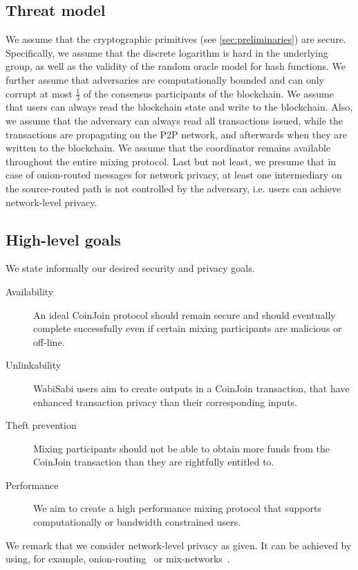 \documentclass[a4paper]{article}
\begin{document}
\subsection{Threat model} \label{sec:threatmodel}

We assume that the cryptographic primitives (see \cref{sec:preliminaries})
are secure. Specifically, we assume that the discrete logarithm is hard in the underlying group, as well as the validity of the random oracle model for hash functions.  We further assume that adversaries are computationally bounded and can only corrupt at most $\frac{1}{3}$ of the consensus participants of the blockchain. We assume that users can always read the blockchain state and write to the blockchain. Also, we assume that the adversary can always read all transactions issued, while the transactions are propagating on the P2P network,
and afterwards when they are written to the blockchain. We assume that the coordinator remains available throughout the entire mixing protocol. Last but not least, we presume that in case of onion-routed messages for network privacy, at least one intermediary on the source-routed path is not controlled by the adversary, i.e. users can achieve network-level privacy.

\subsection{High-level goals} \label{sec:goals}
We state informally our desired security and privacy goals.
\begin{description}
\item[Availability] An ideal CoinJoin protocol should remain secure and should eventually complete successfully even if certain mixing participants are malicious or off-line.
 \item[Unlinkability] WabiSabi users aim to create outputs in a CoinJoin transaction, that have enhanced transaction privacy than their corresponding inputs.
 \item[Theft prevention] Mixing participants should not be able to obtain more funds from the CoinJoin transaction than they are rightfully entitled to.
 \item[Performance] We aim to create a high performance mixing protocol that supports computationally or bandwidth constrained users.
\end{description}

We remark that we consider network-level privacy as given. It can be achieved by using, for example, onion-routing~\cite{reed1998anonymous} or mix-networks~\cite{piotrowska2017loopix}.
\end{document}

